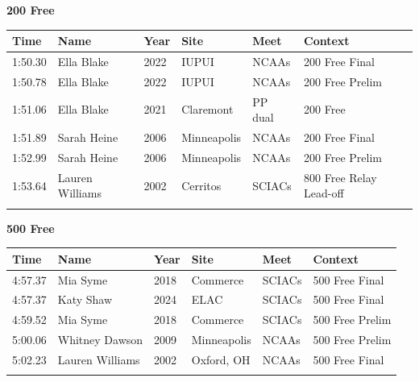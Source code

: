 \noindent\begin{minipage}[t]{0.98\textwidth}
\centering
\textbf{\textcolor{teamprimary}{200 Free}}\par
\vspace{0.5em}
\centering
\small
\renewcommand{\arraystretch}{1.0}
\setlength{\tabcolsep}{4pt}
\begin{tabular}{@{}p{2.0cm}p{3.2cm}p{1.2cm}p{2.0cm}p{2.0cm}p{2.5cm}@{}}
\toprule
\textbf{Time} & \textbf{Name} & \textbf{Year} & \textbf{Site} & \textbf{Meet} & \textbf{Context} \\
\midrule
1:50.30 & Ella Blake & 2022 & IUPUI & NCAAs & 200 Free Final \\
1:50.78 & Ella Blake & 2022 & IUPUI & NCAAs & 200 Free Prelim \\
1:51.06 & Ella Blake & 2021 & Claremont & PP dual & 200 Free \\
1:51.89 & Sarah Heine & 2006 & Minneapolis & NCAAs & 200 Free Final \\
1:52.99 & Sarah Heine & 2006 & Minneapolis & NCAAs & 200 Free Prelim \\
1:53.64 & Lauren Williams & 2002 & Cerritos & SCIACs & 800 Free Relay Lead-off \\
\bottomrule
\vspace{0.5em}
\end{tabular}
\end{minipage}
\vspace{1.2em}
\noindent\begin{minipage}[t]{0.98\textwidth}
\centering
\textbf{\textcolor{teamprimary}{500 Free}}\par
\vspace{0.5em}
\centering
\small
\renewcommand{\arraystretch}{1.0}
\setlength{\tabcolsep}{4pt}
\begin{tabular}{@{}p{2.0cm}p{3.2cm}p{1.2cm}p{2.0cm}p{2.0cm}p{2.5cm}@{}}
\toprule
\textbf{Time} & \textbf{Name} & \textbf{Year} & \textbf{Site} & \textbf{Meet} & \textbf{Context} \\
\midrule
4:57.37 & Mia Syme & 2018 & Commerce & SCIACs & 500 Free Final \\
4:57.37 & Katy Shaw & 2024 & ELAC & SCIACs & 500 Free Final \\
4:59.52 & Mia Syme & 2018 & Commerce & SCIACs & 500 Free Prelim \\
5:00.06 & Whitney Dawson & 2009 & Minneapolis & NCAAs & 500 Free Prelim \\
5:02.23 & Lauren Williams & 2002 & Oxford, OH & NCAAs & 500 Free Final \\
\bottomrule
\vspace{0.5em}
\end{tabular}
\end{minipage}
